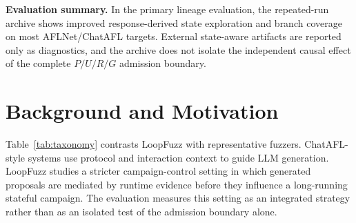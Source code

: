 \documentclass[final,5p,times,number]{elsarticle}
\begin{document}
\textbf{Evaluation summary.} In the primary lineage evaluation, the repeated-run archive shows improved response-derived state exploration and branch coverage on most AFLNet/ChatAFL targets. External state-aware artifacts are reported only as diagnostics, and the archive does not isolate the independent causal effect of the complete $P/U/R/G$ admission boundary.

\section{Background and Motivation}

\begin{table}[ht]
\centering
\caption{Representative fuzzer taxonomy}
\label{tab:taxonomy}
\renewcommand{\arraystretch}{1.3}
\footnotesize
\setlength{\tabcolsep}{3pt}
\normalsize
\end{table}

Table~\ref{tab:taxonomy} contrasts LoopFuzz with representative fuzzers. ChatAFL-style systems use protocol and interaction context to guide LLM generation. LoopFuzz studies a stricter campaign-control setting in which generated proposals are mediated by runtime evidence before they influence a long-running stateful campaign. The evaluation measures this setting as an integrated strategy rather than as an isolated test of the admission boundary alone.
\end{document}
